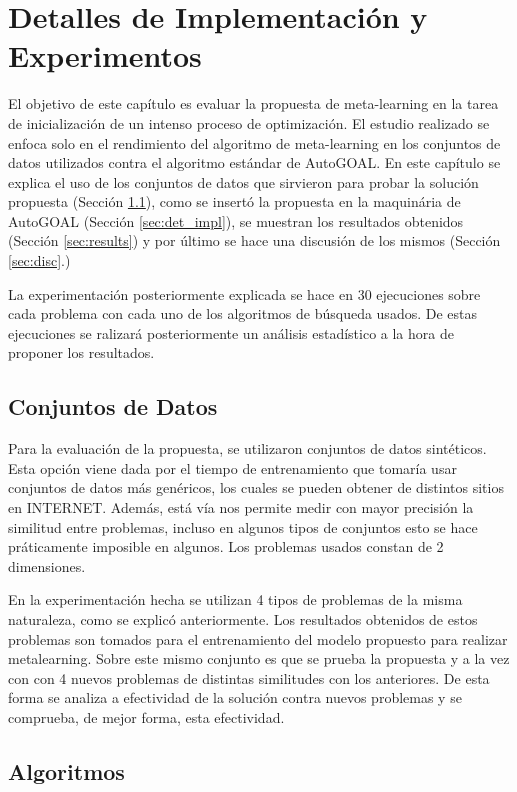 \chapter{Detalles de Implementación y Experimentos}\label{chapter:implementation}

El objetivo de este capítulo es evaluar la propuesta de meta-learning en la
tarea de inicialización de un intenso proceso de optimización. El estudio
realizado se enfoca solo en el rendimiento del algoritmo de meta-learning en
los conjuntos de datos utilizados contra el algoritmo estándar de AutoGOAL.
En este capítulo se explica el uso de los conjuntos de datos que sirvieron
para probar la solución propuesta (Sección \ref{sec:datasets}), como se
insertó la propuesta en la maquinária de AutoGOAL (Sección \ref{sec:det_impl}),
se muestran los resultados obtenidos (Sección \ref{sec:results}) y por último
se hace una discusión de los mismos (Sección \ref{sec:disc}.)

La experimentación posteriormente explicada se hace en 30 ejecuciones sobre
cada problema con cada uno de los algoritmos de búsqueda usados. De estas
ejecuciones se ralizará posteriormente un análisis estadístico a la hora de
proponer los resultados.

\section{Conjuntos de Datos}\label{sec:datasets}

Para la evaluación de la propuesta, se utilizaron conjuntos de datos
sintéticos. Esta opción viene dada por el tiempo de entrenamiento que tomaría
usar conjuntos de datos más genéricos, los cuales se pueden obtener de
distintos sitios en INTERNET. Además, está vía nos permite medir con mayor
precisión la similitud entre problemas, incluso en algunos tipos de conjuntos
esto se hace práticamente imposible en algunos. Los problemas usados constan
de 2 dimensiones.

En la experimentación hecha se utilizan 4 tipos de problemas de la misma
naturaleza, como se explicó anteriormente. Los resultados obtenidos de estos
problemas son tomados para el entrenamiento del modelo propuesto para realizar
metalearning. Sobre este mismo conjunto es que se prueba la propuesta y a la
vez con con 4 nuevos problemas de distintas similitudes con los anteriores.
De esta forma se analiza a efectividad de la solución contra nuevos problemas
y se comprueba, de mejor forma, esta efectividad.

\section{Algoritmos}

